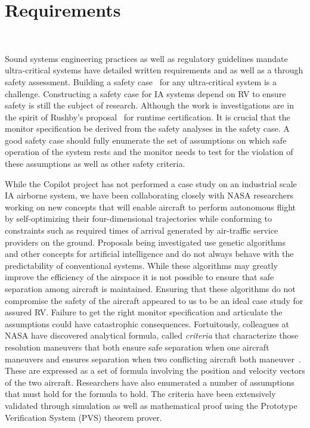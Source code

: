 \section{Requirements}~\label{sec:req}
\noindent{}

Sound systems engineering practices as well as regulatory guidelines
mandate ultra-critical systems have detailed written requirements and
as well as a through safety assessment.  Building a safety
case~\cite{Kelly98arguingsafety} for any ultra-critical system is a 
challenge. Constructing a safety case for  IA  systems  depend on RV to ensure
safety is still the subject of research.  Although the work is  investigations are in
the spirit of Rushby's
proposal~\cite{rvRushby,RushbyAIAA09}  for runtime certification. It
is crucial that the monitor specification be derived from the safety
analyses in the safety case.  A good safety case should fully enumerate the
set of assumptions on which safe operation of the system rests and the
monitor needs to test for the violation of these assumptions as well
as other safety criteria. 

While the Copilot project has not performed a case study on an
industrial scale IA airborne system, we have been collaborating
closely with NASA researchers working on new concepts that will enable
aircraft to perform autonomous flight by self-optimizing their
four-dimensional trajectories while conforming to constraints such as
required times of arrival  generated by air-traffic service
providers on the ground. Proposals being investigated  use genetic
algorithms~\cite{KarrVRC} and other concepts for artificial
intelligence and do not always behave with the predictability of
conventional systems. While these algorithms may greatly improve the
efficiency of the airspace it is not possible to ensure that safe
separation among aircraft is maintained. Ensuring  that these algorithms do
not compromise the safety of the aircraft appeared to us to be an
ideal case study for assured RV.  Failure to get  the right  monitor
specification and articulate the assumptions could have catastrophic
consequences.  Fortuitously, colleagues at NASA have discovered analytical
formula,  called \emph{criteria} that characterize those resolution
maneuvers that both  ensure safe separation when one aircraft maneuvers
and ensures separation when two conflicting aircraft both
maneuver~\cite{NMH14ATIO}. These are expressed as a set of formula involving
the position and velocity vectors of the two aircraft. Researchers
have also  enumerated a number of assumptions that must hold for the formula
to hold. The criteria
have been extensively validated through simulation as well as
mathematical proof using the Prototype Verification System (PVS)
theorem prover. 

